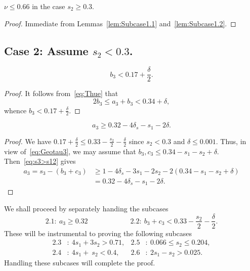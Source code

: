 \begin{lemma}\label{lem:Case1}
  \leanok
  $\nu \leq 0.66$ in the case $s_2 \geq 0.3$.
\end{lemma}
\begin{proof}
  Immediate from Lemmas~\ref{lem:Subcase1.1} and~\ref{lem:Subcase1.2}.
\end{proof}

\subsection*{Case 2: Assume $s_2< 0.3$.}

\begin{lemma}\label{lem:Case2Basic1}
  \leanok
  \begin{equation}\label{eq:2b3}
    b_3 < 0.17+\frac{\delta}{2}.
  \end{equation}
\end{lemma}
\begin{proof}
  \leanok
  It follows from~\eqref{eq:Thue} that
  \begin{equation}
    2b_3 \le a_3 + b_3 < 0.34+\delta,
  \end{equation}
  whence $b_3 < 0.17+\frac{\delta}{2}$.
\end{proof}

\begin{lemma}\label{lem:Case2Basic2}
  \leanok
  \begin{equation}\label{eq:Case2Basic2}
    a_3 \geq 0.32 - 4 \delta_s - s_1 - 2 \delta.
  \end{equation}
\end{lemma}

\begin{proof}
  \leanok
  We have $0.17+\frac{\delta}{2} \leq
  0.33-\frac{s_2}{2}-\frac{\delta}{2}$ since $s_2<0.3$ and $\delta\leq 0.001$. Thus, in view of~\eqref{eq:Geotau3}, we may assume that $b_3,c_3 \leq 0.34-s_1-s_2+ \delta$.
  Then~\eqref{eq:s3>s12} gives
  \begin{align*}
    a_3 = s_3 - (b_3+c_3)
    &\ge 1-4\delta_s - 3s_1 - 2s_2 - 2(0.34 - s_1 - s_2+\delta) \nonumber\\
    &= 0.32-4\delta_s -s_1-2\delta.
  \end{align*}
\end{proof}

We shall proceed by separately handing the subcases
\[
\mathbf{2.1}:\ a_3\geq 0.32 \qquad\qquad\qquad \mathbf{2.2}: \
b_3+c_3<0.33-\frac{s_2}{2}-\frac{\delta}{2}.
 \]
These will be instrumental to proving the following subcases
\begin{align*}
  \mathbf{2.3}&:\ 4s_1+3s_2 > 0.71, &
  \mathbf{2.5}&:\ 0.066\leq s_2\leq 0.204,\\
  \mathbf{2.4}&:\ 4s_1+\ s_2 <0.4 , &
  \mathbf{2.6}&:\ 2s_1-s_2>0.025.
\end{align*}
Handling these subcases will complete the proof.

